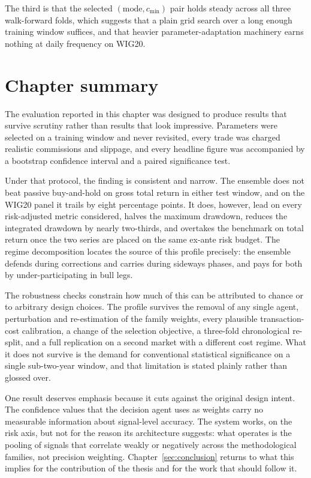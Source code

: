The third is that the selected $(\text{mode}, c_{\min})$ pair holds steady across all three walk-forward folds, which suggests that a plain grid search over a long enough training window suffices, and that heavier parameter-adaptation machinery earns nothing at daily frequency on WIG20.

\section{Chapter summary}\label{sec:evaluation_summary}

The evaluation reported in this chapter was designed to produce results that survive scrutiny rather than results that look impressive. Parameters were selected on a training window and never revisited, every trade was charged realistic commissions and slippage, and every headline figure was accompanied by a bootstrap confidence interval and a paired significance test.

Under that protocol, the finding is consistent and narrow. The ensemble does not beat passive buy-and-hold on gross total return in either test window, and on the WIG20 panel it trails by eight percentage points. It does, however, lead on every risk-adjusted metric considered, halves the maximum drawdown, reduces the integrated drawdown by nearly two-thirds, and overtakes the benchmark on total return once the two series are placed on the same ex-ante risk budget. The regime decomposition locates the source of this profile precisely: the ensemble defends during corrections and carries during sideways phases, and pays for both by under-participating in bull legs.

The robustness checks constrain how much of this can be attributed to chance or to arbitrary design choices. The profile survives the removal of any single agent, perturbation and re-estimation of the family weights, every plausible transaction-cost calibration, a change of the selection objective, a three-fold chronological re-split, and a full replication on a second market with a different cost regime. What it does not survive is the demand for conventional statistical significance on a single sub-two-year window, and that limitation is stated plainly rather than glossed over.

One result deserves emphasis because it cuts against the original design intent. The confidence values that the decision agent uses as weights carry no measurable information about signal-level accuracy. The system works, on the risk axis, but not for the reason its architecture suggests: what operates is the pooling of signals that correlate weakly or negatively across the methodological families, not precision weighting. Chapter~\ref{sec:conclusion} returns to what this implies for the contribution of the thesis and for the work that should follow it.
